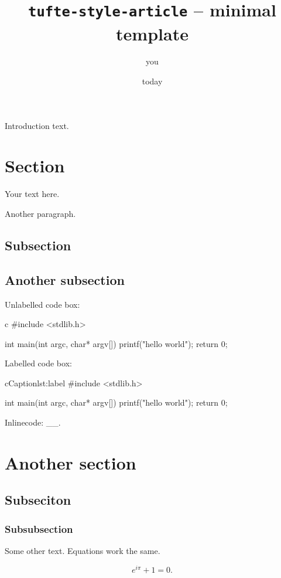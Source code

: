 \documentclass[
]{tufte-style-article}
\title{\texttt{tufte-style-article} -- minimal template}
\author{you}
\date{today}
\begin{document}
\maketitle

Introduction text.


\section{Section}

Your text here.

Another paragraph.

\subsection{Subsection}



\newpage
{}

\subsection{Another subsection}

Unlabelled code box:

\begin{codebox}{c}
#include <stdlib.h>

int main(int argc, char* argv[]) {
    printf("hello world");
    return 0;
}
\end{codebox}

Labelled code box:

\begin{snippet}{c}{Caption}{lst:label}
#include <stdlib.h>

int main(int argc, char* argv[]) {
    printf("hello world");
    return 0;
}
\end{snippet}

Inlinecode: __.


\section{Another section}


\subsection{Subseciton}


\subsubsection{Subsubsection}

Some other text. Equations work the same.

$$
e^{i\pi}+1 = 0.
$$
\end{document}
